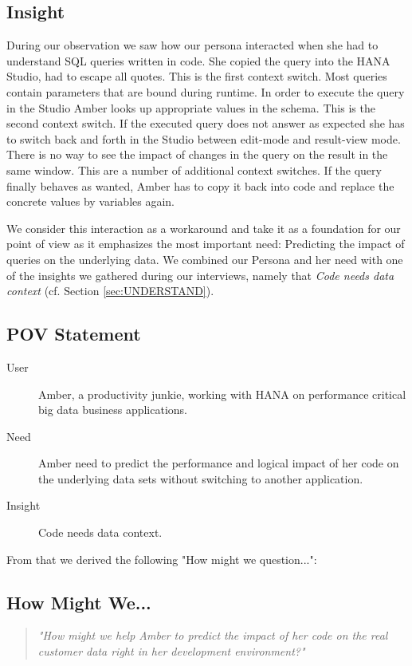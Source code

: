 \subsection{Insight}

During our observation we saw how our persona interacted when she had to understand SQL queries written in code. She copied the query into the HANA Studio, had to escape all quotes. This is the first context switch. Most queries contain parameters that are bound during runtime. In order to execute the query in the Studio Amber looks up appropriate values in the schema. This is the second context switch. If the executed query does not answer as expected she has to switch back and forth in the Studio between edit-mode and result-view mode. There is no way to see the impact of changes in the query on the result in the same window. This are a number of additional context switches. If the query finally behaves as wanted, Amber has to copy it back into code and replace the concrete values by variables again.  

We consider this interaction as a workaround and take it as a foundation for our point of view as it emphasizes the most important need: Predicting the impact of queries on the underlying data. We combined our Persona and her need with one of the insights we gathered during our interviews, namely that \textit{Code needs data context} (cf. Section \ref{sec:UNDERSTAND}).


\subsection{POV Statement}

\begin{description}
	\item [User] Amber, a productivity junkie, working with HANA on performance critical big data business applications.
	\item [Need] Amber need to predict the performance and logical impact of her code on the underlying data sets without switching to another application.
	\item [Insight] Code needs data context.
\end{description}

From that we derived the following "How might we question...":

\subsection{How Might We...}

\begin{quote}
\emph{"How might we help Amber to predict the impact of her code on the real customer data right in her development environment?"}
\end{quote}
